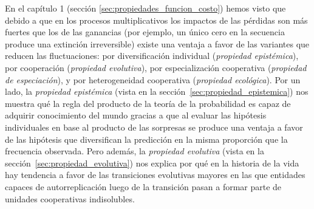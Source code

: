\documentclass[a4paper,11pt]{book}
\theoremstyle{definition}
\begin{document}
En el capítulo 1 (sección \ref{sec:propiedades_funcion_costo}) hemos visto que debido a que en los procesos multiplicativos los impactos de las pérdidas son más fuertes que los de las ganancias (por ejemplo, un único cero en la secuencia produce una extinción irreversible) existe una ventaja a favor de las variantes que reducen las fluctuaciones: por diversificación individual (\emph{propiedad epistémica}), por cooperación (\emph{propiedad evolutiva}), por especialización cooperativa (\emph{propiedad de especiación}), y por heterogeneidad cooperativa (\emph{propiedad ecológica}).
%
Por un lado, la \emph{propiedad epistémica} (vista en la sección~\ref{sec:propiedad_epistemica}) nos muestra qué la regla del producto de la teoría de la probabilidad es capaz de adquirir conocimiento del mundo gracias a que al evaluar las hipótesis individuales en base al producto de las sorpresas se produce una ventaja a favor de las hipótesis que diversifican la predicción en la misma proporción que la frecuencia observada.
%
Pero además, la \emph{propiedad evolutiva} (vista en la sección~\ref{sec:propiedad_evolutiva}) nos explica por qué en la historia de la vida hay tendencia a favor de las transiciones evolutivas mayores en las que entidades capaces de autorreplicación luego de la transición pasan a formar parte de unidades cooperativas indisolubles.

\end{document}
